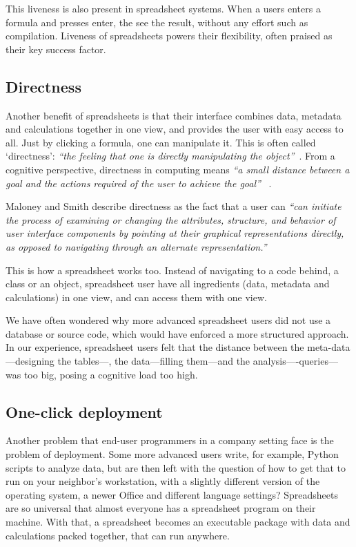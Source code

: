 \documentclass[conference]{IEEEtran}
\begin{document}
This liveness is also present in spreadsheet systems. When a users enters a formula and presses enter, the see the result, without any effort such as compilation. Liveness of spreadsheets powers their flexibility, often praised as their key success factor.

\subsection{Directness}
Another benefit of spreadsheets is that their interface combines data, metadata and calculations together in one view, and provides the user with easy access to all. Just by clicking a formula, one can manipulate it. This is often called `directness': \emph{``the feeling
that one is directly manipulating the object''}~\cite{shneiderman_direct_1983}. From a cognitive perspective, directness in computing means \emph{``a small distance between a goal and the actions required of the user to achieve the goal''} ~\cite{burnett_visual_2001}.

Maloney and Smith describe directness as the fact that a user can  \emph{``can initiate the process of examining or changing the attributes, structure, and behavior of user interface components by pointing at their graphical representations directly, as opposed to navigating through an alternate representation.''}~\cite{maloney_directness_1995}

This is how a spreadsheet works too. Instead of navigating to a code behind, a class or an object, spreadsheet user have all ingredients (data, metadata and calculations) in one view, and can access them with one view. 

We have often wondered why more advanced spreadsheet users did not use a database or source code, which would have enforced a more structured approach. In our experience, spreadsheet users felt that the distance between the meta-data---designing the tables---, the data---filling them---and the analysis----queries---was too big, posing a cognitive load too high.


\subsection{One-click deployment}
Another problem that end-user programmers in a company setting face is the problem of deployment. Some more advanced users write, for example, Python scripts to analyze data, but are then left with the question of how to get that to run on your neighbor's workstation, with a slightly different version of the operating system, a newer Office and different language settings? Spreadsheets are so universal that almost everyone has a spreadsheet program on their machine. With that, a spreadsheet becomes an executable package with data and calculations packed together, that can run anywhere.
\end{document}
